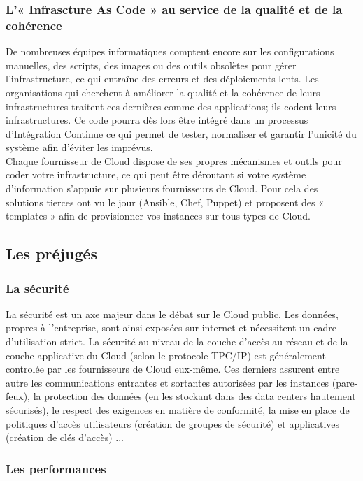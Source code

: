         \subsubsection{L'« Infrascture As Code » au service de la qualité et de la cohérence}
        De nombreuses équipes informatiques comptent encore sur les configurations manuelles, des scripts, des images ou des outils obsolètes pour gérer l'infrastructure, ce qui entraîne des erreurs et des déploiements lents. Les organisations qui cherchent à améliorer la qualité et la cohérence de leurs infrastructures traitent ces dernières comme des applications; ils codent leurs infrastructures. Ce code pourra dès lors être intégré dans un processus d'Intégration Continue ce qui permet de tester, normaliser et garantir l'unicité du système afin d'éviter les imprévus.\\

        Chaque fournisseur de Cloud dispose de ses propres mécanismes et outils pour coder votre infrastructure, ce qui peut être déroutant si votre système d'information s'appuie sur plusieurs fournisseurs de Cloud. Pour cela des solutions tierces ont vu le jour (Ansible, Chef, Puppet) et proposent des « templates » afin de provisionner vos instances sur tous types de Cloud.

      \subsection{Les préjugés}
        \subsubsection{La sécurité}
        La sécurité est un axe majeur dans le débat sur le Cloud public. Les données, propres à l'entreprise, sont ainsi exposées sur internet et nécessitent un cadre d'utilisation strict. La sécurité au niveau de la couche d'accès au réseau et de la couche applicative du Cloud (selon le protocole TPC/IP) est généralement controlée par les fournisseurs de Cloud eux-même. Ces derniers assurent entre autre les communications entrantes et sortantes autorisées par les instances (pare-feux), la protection des données (en les stockant dans des data centers hautement sécurisés), le respect des exigences en matière de conformité, la mise en place de politiques d'accès utilisateurs (création de groupes de sécurité) et applicatives (création de clés d'accès) ...

        \subsubsection{Les performances}

